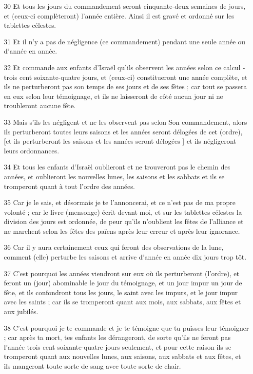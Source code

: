 \par 30 Et tous les jours du commandement seront cinquante-deux semaines de jours, et (ceux-ci complèteront) l'année entière. Ainsi il est gravé et ordonné sur les tablettes célestes.
\par 31 Et il n'y a pas de négligence (ce commandement) pendant une seule année ou d'année en année.
\par 32 Et commande aux enfants d'Israël qu'ils observent les années selon ce calcul - trois cent soixante-quatre jours, et (ceux-ci) constitueront une année complète, et ils ne perturberont pas son temps de ses jours et de ses fêtes ; car tout se passera en eux selon leur témoignage, et ils ne laisseront de côté aucun jour ni ne troubleront aucune fête.
\par 33 Mais s'ils les négligent et ne les observent pas selon Son commandement, alors ils perturberont toutes leurs saisons et les années seront délogées de cet (ordre), [et ils perturberont les saisons et les années seront délogées ] et ils négligeront leurs ordonnances.
\par 34 Et tous les enfants d'Israël oublieront et ne trouveront pas le chemin des années, et oublieront les nouvelles lunes, les saisons et les sabbats et ils se tromperont quant à tout l'ordre des années.
\par 35 Car je le sais, et désormais je te l'annoncerai, et ce n'est pas de ma propre volonté ; car le livre (mensonge) écrit devant moi, et sur les tablettes célestes la division des jours est ordonnée, de peur qu'ils n'oublient les fêtes de l'alliance et ne marchent selon les fêtes des païens après leur erreur et après leur ignorance.
\par 36 Car il y aura certainement ceux qui feront des observations de la lune, comment (elle) perturbe les saisons et arrive d'année en année dix jours trop tôt.
\par 37 C'est pourquoi les années viendront sur eux où ils perturberont (l'ordre), et feront un (jour) abominable le jour du témoignage, et un jour impur un jour de fête, et ils confondront tous les jours, le saint avec les impurs, et le jour impur avec les saints ; car ils se tromperont quant aux mois, aux sabbats, aux fêtes et aux jubilés.
\par 38 C'est pourquoi je te commande et je te témoigne que tu puisses leur témoigner ; car après ta mort, tes enfants les dérangeront, de sorte qu'ils ne feront pas l'année trois cent soixante-quatre jours seulement, et pour cette raison ils se tromperont quant aux nouvelles lunes, aux saisons, aux sabbats et aux fêtes, et ils mangeront toute sorte de sang avec toute sorte de chair.

